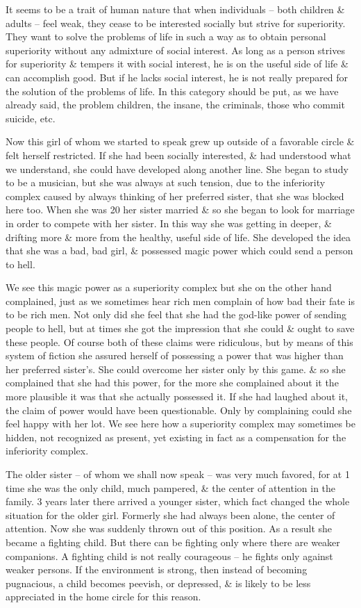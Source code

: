 \documentclass{article}
\numberwithin{equation}{section}
\begin{document}
It seems to be a trait of human nature that when individuals -- both children \& adults -- feel weak, they cease to be interested socially but strive for superiority. They want to solve the problems of life in such a way as to obtain personal superiority without any admixture of social interest. As long as a person strives for superiority \& tempers it with social interest, he is on the useful side of life \& can accomplish good. But if he lacks social interest, he is not really prepared for the solution of the problems of life. In this category should be put, as we have already said, the problem children, the insane, the criminals, those who commit suicide, etc.

Now this girl of whom we started to speak grew up outside of a favorable circle \& felt herself restricted. If she had been socially interested, \& had understood what we understand, she could have developed along another line. She began to study to be a musician, but she was always at such tension, due to the inferiority complex caused by always thinking of her preferred sister, that she was blocked here too. When she was 20 her sister married \& so she began to look for marriage in order to compete with her sister. In this way she was getting in deeper, \& drifting more \& more from the healthy, useful side of life. She developed the idea that she was a bad, bad girl, \& possessed magic power which could send a person to hell.

We see this magic power as a superiority complex but she on the other hand complained, just as we sometimes hear rich men complain of how bad their fate is to be rich men. Not only did she feel that she had the god-like power of sending people to hell, but at times she got the impression that she could \& ought to save these people. Of course both of these claims were ridiculous, but by means of this system of fiction she assured herself of possessing a power that was higher than her preferred sister's. She could overcome her sister only by this game. \& so she complained that she had this power, for the more she complained about it the more plausible it was that she actually possessed it. If she had laughed about it, the claim of power would have been questionable. Only by complaining could she feel happy with her lot. We see here how a superiority complex may sometimes be hidden, not recognized as present, yet existing in fact as a compensation for the inferiority complex.

The older sister -- of whom we shall now speak -- was very much favored, for at 1 time she was the only child, much pampered, \& the center of attention in the family. 3 years later there arrived a younger sister, which fact changed the whole situation for the older girl. Formerly she had always been alone, the center of attention. Now she was suddenly thrown out of this position. As a result she became a fighting child. But there can be fighting only where there are weaker companions. A fighting child is not really courageous -- he fights only against weaker persons. If the environment is strong, then instead of becoming pugnacious, a child becomes peevish, or depressed, \& is likely to be less appreciated in the home circle for this reason.
\end{document}
